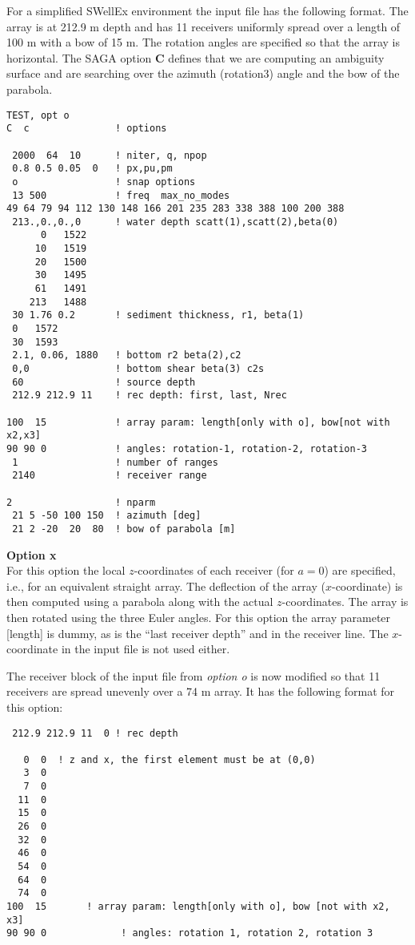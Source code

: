 \documentclass{saclantc}
\begin{document}
For a simplified SWellEx environment the input file has the following
format. The array is at 212.9 m depth and has 11 receivers uniformly
spread over a length of 100 m with a
bow of 15 m. The rotation angles are specified so that the array is
horizontal. The SAGA option {\bf C} defines that we are computing an
ambiguity surface and are searching over the azimuth (rotation3) angle and the bow
of the parabola.
\small
\begin{verbatim}
TEST, opt o
C  c               ! options 

 2000  64  10      ! niter, q, npop
 0.8 0.5 0.05  0   ! px,pu,pm
 o                 ! snap options
 13 500            ! freq  max_no_modes
49 64 79 94 112 130 148 166 201 235 283 338 388 100 200 388
 213.,0.,0.,0      ! water depth scatt(1),scatt(2),beta(0)
      0   1522 
     10   1519 
     20   1500 
     30   1495 
     61   1491 
    213   1488 
 30 1.76 0.2       ! sediment thickness, r1, beta(1)
 0   1572
 30  1593
 2.1, 0.06, 1880   ! bottom r2 beta(2),c2
 0,0               ! bottom shear beta(3) c2s
 60                ! source depth
 212.9 212.9 11    ! rec depth: first, last, Nrec

100  15            ! array param: length[only with o], bow[not with x2,x3]
90 90 0            ! angles: rotation-1, rotation-2, rotation-3
 1                 ! number of ranges
 2140              ! receiver range

2                  ! nparm                 
 21 5 -50 100 150  ! azimuth [deg]
 21 2 -20  20  80  ! bow of parabola [m]
\end{verbatim}
\normalsize

{\large \bf Option x}\\
For this option the local $z$-coordinates of each receiver (for $a=0$) are
specified, i.e., for an equivalent straight array. The deflection of the
array ($x$-coordinate) is then computed using a parabola along with
the actual $z$-coordinates. The array is then rotated using the three Euler angles.
For this option the array parameter [length] is
dummy, as is the ``last receiver depth'' and in
the receiver line. The $x$-coordinate in the input file is not used either.

The receiver block of the input file from {\it option o} is now
modified so that 11 receivers are spread unevenly over a 74 m array.
It has the following format for this option:
\small
\begin{verbatim}
 212.9 212.9 11  0 ! rec depth

   0  0  ! z and x, the first element must be at (0,0) 
   3  0
   7  0
  11  0
  15  0
  26  0
  32  0
  46  0
  54  0
  64  0
  74  0
100  15       ! array param: length[only with o], bow [not with x2, x3]
90 90 0             ! angles: rotation 1, rotation 2, rotation 3
\end{verbatim}
\normalsize
\end{document}
